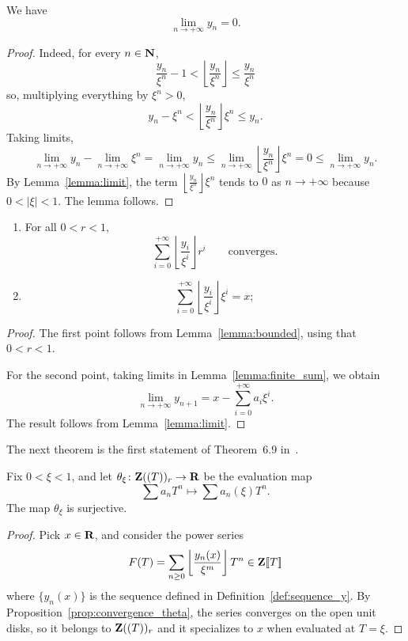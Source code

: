 \begin{lemma}\label{lemma:limit}
We have
\[
\lim_{n\to+\infty} y_n =0.
\]
\end{lemma}
\begin{proof}
Indeed, for every $n\in \mathbf{N}$,
\[
\frac{y_n}{\xi^n} - 1 <\left\lfloor{\frac{y_n}{\xi^n}}\right\rfloor \le \frac{y_n}{\xi^n}
\]
so, multiplying everything by $\xi^n > 0$,
\[
y_n - \xi^n <\left\lfloor{\frac{y_n}{\xi^n}}\right\rfloor\xi^n \le y_n.
\]
Taking limits,
\[
\lim_{n\to+\infty}y_n-\lim_{n\to+\infty}\xi^n=\lim_{n\to+\infty}y_n\le \lim_{n\to+\infty}\left\lfloor\frac{y_n}{\xi^n}\right\rfloor\xi^n=0\le\lim_{n\to+\infty}y_n.
\]
By Lemma~\ref{lemma:limit}, the term $\left\lfloor\frac{y_n}{\xi^n}\right\rfloor\xi^n$  tends to $0$ as $n\to +\infty$ because $0<\lvert \xi\rvert< 1$. The lemma follows.
\end{proof}
\begin{proposition}\label{prop:convergence_theta}
\begin{enumerate}
\item For all $0<r <1$,
\[
\sum_{i=0}^{+\infty} \left\lfloor\frac{y_i}{\xi^i}\right\rfloor r^i \qquad\text{converges}.
\]
\item
\[
\sum_{i=0}^{+\infty} \left\lfloor\frac{y_i}{\xi^i}\right\rfloor\xi^i = x;
\]
\end{enumerate}
\end{proposition}
\begin{proof} 
The first point follows from Lemma~\ref{lemma:bounded}, using that $0<r<1$.

For the second point, taking limits in Lemma~\ref{lemma:finite_sum}, we obtain
\[
\lim_{n\to +\infty}y_{n+1}=x-\sum_{i=0}^{+\infty}a_i\xi^i.
\]
The result follows from Lemma~\ref{lemma:limit}.
\end{proof}
The next theorem is the first statement of Theorem~6.9 in~\cite{Analytic}.
\begin{theorem}
Fix $0<\xi <1$, and let $\theta_{\xi}\colon \mathbf{Z}((T))_r\rightarrow \mathbf{R}$ be the evaluation map
\[
\sum a_nT^n\longmapsto \sum a_n(\xi)T^n.
\]
The map $\theta_{\xi}$ is surjective.
\end{theorem}
\begin{proof}
Pick $x\in \mathbf{R}$, and consider the power series
\[
F(T)=\sum_{n\geq 0}\left\lfloor \frac{y_n(x)}{\xi^m}\right\rfloor T^n\in\mathbf{Z}[\![T]\!]
\]
where $\{y_n(x)\}$ is the sequence defined in Definition~\ref{def:sequence_y}. By Proposition~\ref{prop:convergence_theta}, the series converges on the open unit disks, so it belongs to $\mathbf{Z}((T))_r$ and it specializes to $x$ when evaluated at $T=\xi$.
\end{proof}